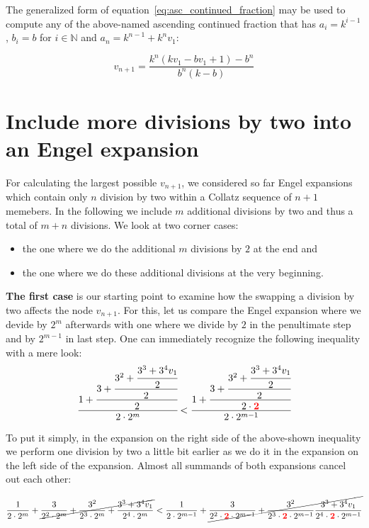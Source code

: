 \documentclass[12pt]{amsart}
\theoremstyle{definition}
\begin{document}
\par\medskip
The generalized form of equation~\ref{eq:asc_continued_fraction} may be used to compute any of the above-named ascending continued fraction that has $a_i=k^{i-1}$, $b_i=b$ for $i\in\mathbb{N}$ and $a_n=k^{n-1}+k^nv_1$:

\par\medskip
\begin{equation}
\label{eq:generalized_asc_continued_fraction}
v_{n+1}=\frac{k^n(kv_1-bv_1+1)-b^n}{b^n(k-b)}
\end{equation}

\section{Include more divisions by two into an Engel expansion}
\label{sec:include_divisions_engel_expansion}
For calculating the largest possible $v_{n+1}$, we considered so far Engel expansions which contain only $n$ division by two within a Collatz sequence of $n+1$ memebers. In the following we include $m$ additional divisions by two and thus a total of $m+n$ divisions. We look at two corner cases:
\begin{itemize}
	\item the one where we do the additional $m$ divisions by $2$ at the end and
	\item the one where we do these additional divisions at the very beginning.
\end{itemize}

\par\noindent
\textbf{The first case} is our starting point to examine how the swapping a division by two affects the node $v_{n+1}$. For this, let us compare the Engel expansion where we devide by $2^m$ afterwards with one where we divide by $2$ in the penultimate step and by $2^{m-1}$ in last step. One can immediately recognize the following inequality with a mere look:
\[
\cfrac{1+\cfrac{3+\cfrac{3^2+\cfrac{3^3+3^4v_1}{2}}{2}}{2}}{2\cdot2^m}
<
\cfrac{1+\cfrac{3+\cfrac{3^2+\cfrac{3^3+3^4v_1}{2}}{2}}{2\cdot\textcolor{red}{\mathbf{2}}}}{2\cdot2^{m-1}}
\]

To put it simply, in the expansion on the right side of the above-shown inequality we perform one division by two a little bit earlier as we do it in the expansion on the left side of the expansion. Almost all summands of both expansions cancel out each other:

\[
\frac{1}{2\cdot2^m}+\cancel{\frac{3}{2^2\cdot2^m}+\frac{3^2}{2^3\cdot2^m}+\frac{3^3+3^4v_1}{2^4\cdot2^m}}
<
\frac{1}{2\cdot2^{m-1}}+\cancel{\frac{3}{2^2\cdot\textcolor{red}{\mathbf{2}}\cdot2^{m-1}}+\frac{3^2}{2^3\cdot\textcolor{red}{\mathbf{2}}\cdot2^{m-1}}\frac{3^3+3^4v_1}{2^4\cdot\textcolor{red}{\mathbf{2}}\cdot2^{m-1}}}
\]
\end{document}
